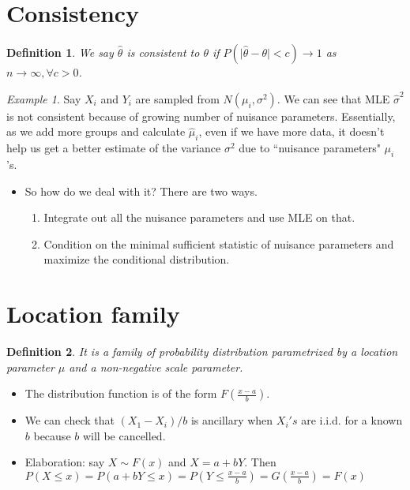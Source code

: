 \documentclass[11pt,reqno]{amsart}
\newtheorem{definition}{Definition}
\theoremstyle{remark}
\newtheorem{example}{Example}
\begin{document}
\section{Consistency}
\begin{definition}
We say $\hat\theta$ is consistent to $\theta$ if $P(\lvert \hat\theta-\theta\rvert<c)\to 1$ as $n\to\infty, \forall c>0$.
\end{definition}
\begin{example}
Say $X_i$ and $Y_i$ are sampled from $N(\mu_i,\sigma^2)$. We can see that MLE $\hat\sigma^2$ is not consistent because of growing
number of nuisance parameters. Essentially, as we add more groups and calculate $\hat\mu_i$, even if
we have more data, it doesn't help us get a better estimate of the variance $\sigma^2$ due to ``nuisance parameters" $\mu_i$'s.
\end{example}
\begin{itemize}
\item So how do we deal with it? There are two ways.
\begin{enumerate}
\item Integrate out all the nuisance parameters and use MLE on that.
\item Condition on the minimal sufficient statistic of nuisance parameters and maximize the conditional distribution.
\end{enumerate} 
\end{itemize}

\section{Location family}
\begin{definition}
It is a family of probability distribution parametrized by a location parameter $\mu$ and a non-negative scale parameter.
\end{definition}
\begin{itemize}
\item The distribution function is of the form $F(\frac{x-a}{b})$.
\item We can check that $(X_1-X_i)/b$ is ancillary when $X_i's$ are i.i.d. for a known $b$ because $b$ will be cancelled.
\item Elaboration: say $X\sim F(x)$ and $X=a+bY$. Then $P(X\leq x)=P(a+bY\leq x)=P(Y\leq\frac{x-a}b)=G(\frac{x-a}b)=F(x)$
\end{itemize}
\end{document}
